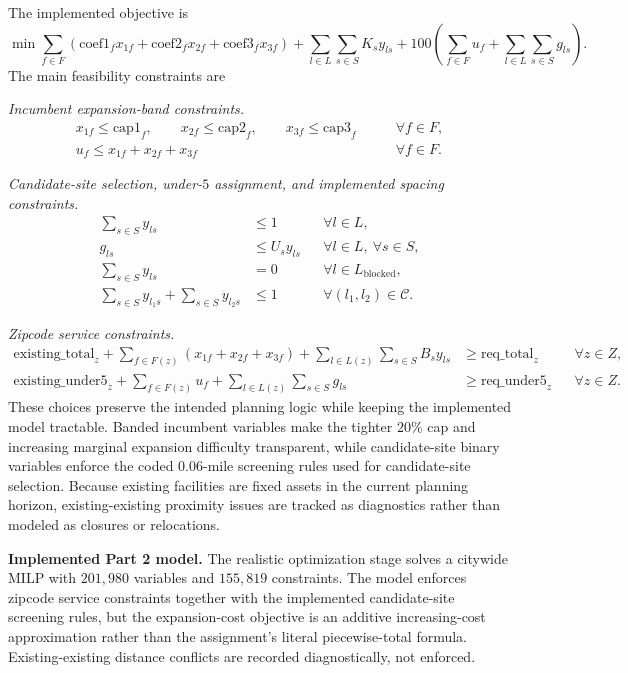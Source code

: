 \documentclass[11pt]{article}
\begin{document}
The implemented objective is
\[
\min \sum_{f \in F}\left(\mathrm{coef1}_f x_{1f}+\mathrm{coef2}_f x_{2f}+\mathrm{coef3}_f x_{3f}\right)
 + \sum_{l \in L}\sum_{s \in S} K_s y_{ls}
 + 100\left(\sum_{f \in F}u_f+\sum_{l \in L}\sum_{s \in S}g_{ls}\right).
\]
The main feasibility constraints are

\noindent\textit{Incumbent expansion-band constraints.}
\[
\begin{aligned}
x_{1f} \le \mathrm{cap1}_f,\qquad
x_{2f} \le \mathrm{cap2}_f,\qquad
x_{3f} \le \mathrm{cap3}_f
&\qquad \forall f \in F,\\
u_f \le x_{1f}+x_{2f}+x_{3f}
&\qquad \forall f \in F.
\end{aligned}
\]

\noindent\textit{Candidate-site selection, under-\(5\) assignment, and implemented spacing constraints.}
\[
\begin{aligned}
\sum_{s \in S} y_{ls} &\le 1 && \forall l \in L,\\
g_{ls} &\le U_s y_{ls} && \forall l \in L,\ \forall s \in S,\\
\sum_{s \in S} y_{ls} &= 0 && \forall l \in L_{\text{blocked}},\\
\sum_{s \in S} y_{l_1s} + \sum_{s \in S} y_{l_2s}
&\le 1 && \forall (l_1,l_2)\in \mathcal{C}.
\end{aligned}
\]

\noindent\textit{Zipcode service constraints.}
\[
\begin{aligned}
\mathrm{existing\_total}_z + \sum_{f \in F(z)}(x_{1f}+x_{2f}+x_{3f}) + \sum_{l \in L(z)}\sum_{s \in S} B_s y_{ls}
&\ge \mathrm{req\_total}_z && \forall z \in Z,\\
\mathrm{existing\_under5}_z + \sum_{f \in F(z)}u_f + \sum_{l \in L(z)}\sum_{s \in S} g_{ls}
&\ge \mathrm{req\_under5}_z && \forall z \in Z.
\end{aligned}
\]
These choices preserve the intended planning logic while keeping the implemented model tractable. Banded incumbent variables make the tighter \(20\%\) cap and increasing marginal expansion difficulty transparent, while candidate-site binary variables enforce the coded \(0.06\)-mile screening rules used for candidate-site selection. Because existing facilities are fixed assets in the current planning horizon, existing-existing proximity issues are tracked as diagnostics rather than modeled as closures or relocations.

\begin{resultbox}
\textbf{Implemented Part 2 model.}
The realistic optimization stage solves a citywide MILP with \(201{,}980\) variables and \(155{,}819\) constraints. The model enforces zipcode service constraints together with the implemented candidate-site screening rules, but the expansion-cost objective is an additive increasing-cost approximation rather than the assignment's literal piecewise-total formula. Existing-existing distance conflicts are recorded diagnostically, not enforced.
\end{resultbox}
\end{document}
